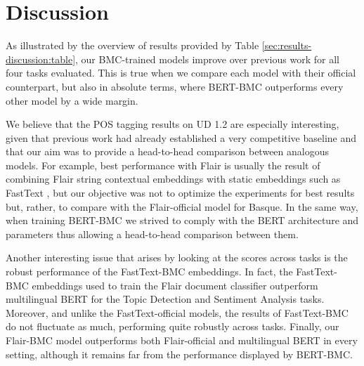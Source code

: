 \documentclass[10pt, a4paper]{article}
\begin{document}

\section{Discussion}\label{sec:discussion}

As illustrated by the overview of results provided by Table \ref{sec:results-discussion:table}, our BMC-trained models improve over previous work for all four tasks evaluated. This is true when we compare each model with their official counterpart, but also in absolute terms, where BERT-BMC outperforms every other model by a wide margin.

We believe that the POS tagging results on UD 1.2 are especially interesting, given that previous work had already established a very competitive baseline \cite{heinzerling-strube-2019-sequence} and that our aim was to provide a head-to-head comparison between analogous models. For example, best performance with Flair is usually the result of combining Flair string contextual embeddings with static embeddings such as FastText \cite{akbik2018coling}, but our objective was not to optimize the experiments for best results but, rather, to compare with the Flair-official model for Basque. In the same way, when training BERT-BMC we strived to comply with the BERT architecture and parameters thus allowing a
head-to-head comparison between them.

Another interesting issue that arises by looking at the scores across tasks is the robust performance of the FastText-BMC embeddings. In fact, the FastText-BMC embeddings used to train the Flair document classifier outperform multilingual BERT for the Topic Detection and Sentiment Analysis tasks. Moreover, and unlike the FastText-official models, the results of FastText-BMC do not fluctuate as much, performing quite robustly across tasks. Finally, our Flair-BMC model outperforms both Flair-official and multilingual BERT in every setting, although it remains far from the performance displayed by BERT-BMC.
\end{document}
